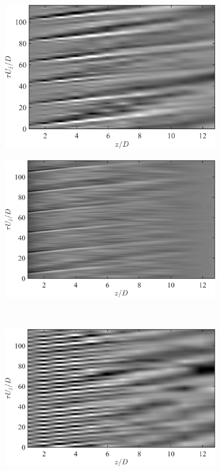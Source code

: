 \begin{figure}
	\centering
	\begin{subfigure}{.5\textwidth}
		\centering
		\includegraphics[width=0.95\linewidth]{Figures/ch5_st005_NearField_wvpkts.png}
		\caption{}
	\end{subfigure}%
	\begin{subfigure}{.5\textwidth}
		\centering
		\includegraphics[width=0.95\linewidth]{Figures/ch5_st005_FlowField_wvpkts.png}
		\caption{}
	\end{subfigure}\\
	\begin{subfigure}{.5\textwidth}
		\centering
		\includegraphics[width=0.95\linewidth]{Figures/ch5_st025_NearField_wvpkts.png}

\end{subfigure}
\end{figure}
